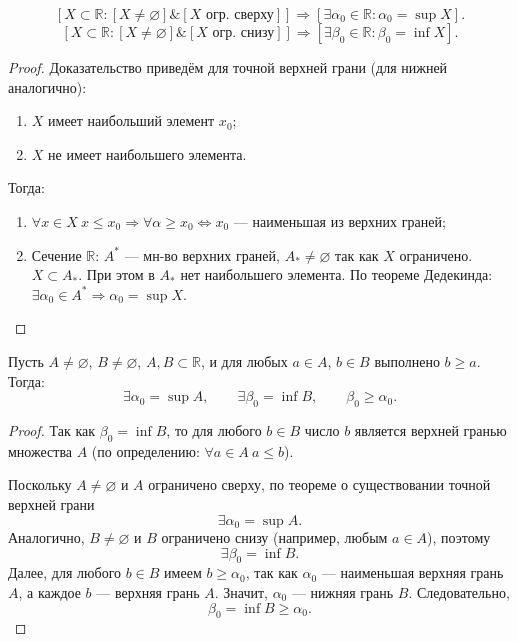 \begin{theorem} 
\[
[X \subset \mathbb{R}: \left[X \neq \varnothing \right] \& \left[X
\text{ огр. сверху}\right]] \Rightarrow
[\exists \alpha_0 \in \mathbb{R}: \alpha_0 = \sup X].
\]
\[
[X \subset \mathbb{R}: \left[X \neq \varnothing \right] \& \left[X
\text{ огр. снизу}\right]]
\Rightarrow
[\exists \beta_0 \in \mathbb{R}: \beta_0 = \inf X].
\]
\end{theorem}

\begin{proof}
Доказательство приведём для точной верхней грани (для нижней аналогично):
\begin{enumerate}
\item \(X\) имеет наибольший элемент \(x_0\);
\item \(X\) не имеет наибольшего элемента.
\end{enumerate}

Тогда:

\begin{enumerate}
\item \(\forall x \in X \ x \le x_0 \Rightarrow \forall \alpha \ge x_0
\Leftrightarrow x_0\) --- наименьшая из верхних граней;
\item Сечение \(\mathbb{R}\): \(A^*\) --- мн-во верхних граней,
\(A_* \neq \varnothing\) так как \(X\) ограничено. \(X \subset A_*\). При этом в
\(A_*\) нет наибольшего элемента. По теореме Дедекинда: \(\exists \alpha_0 \in
A^* \Rightarrow \alpha_0 = \sup X\).
\end{enumerate}
\end{proof}


\begin{theorem}
Пусть \(A \neq \varnothing\), \(B \neq \varnothing\), \(A, B \subset \mathbb{R}\),
и для любых \(a \in A\), \(b \in B\) выполнено \(b \ge a\). Тогда:
\[
\exists \alpha_0 = \sup A,\qquad \exists \beta_0 = \inf B,\qquad
\beta_0 \ge \alpha_0.
\]
\end{theorem}

\begin{proof}
Так как \(\beta_0 = \inf B\), то для любого \(b \in B\) число \(b\) является
верхней гранью множества \(A\) (по определению: \(\forall a \in A\ a \le b\)).

Поскольку \(A \neq \varnothing\) и \(A\) ограничено сверху, по теореме о
существовании точной верхней грани
\[
\exists \alpha_0 = \sup A.
\]
Аналогично, \(B \neq \varnothing\) и \(B\) ограничено снизу (например, любым
\(a \in A\)), поэтому
\[
\exists \beta_0 = \inf B.
\]
Далее, для любого \(b \in B\) имеем \(b \ge \alpha_0\), так как \(\alpha_0\) ---
наименьшая верхняя грань \(A\), а каждое \(b\) --- верхняя грань \(A\). Значит,
\(\alpha_0\) --- нижняя грань \(B\). Следовательно,
\[
\beta_0 = \inf B \ge \alpha_0.
\]
\end{proof}


